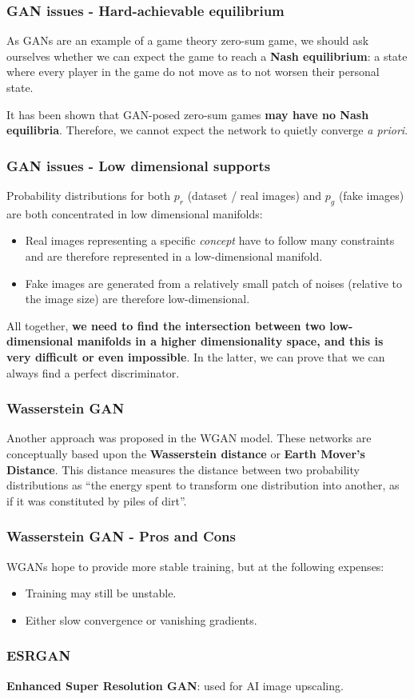 \begin{frame}
    \frametitle{GAN issues - Hard-achievable equilibrium}
    As GANs are an example of a game theory zero-sum game, we should ask ourselves whether we can expect the game to reach a \textbf{Nash equilibrium}: a state where every player in the game do not move as to not worsen their personal state.

    It has been shown that GAN-posed zero-sum games \textbf{may have no Nash equilibria}. Therefore, we cannot expect the network to quietly converge \emph{a priori}.
\end{frame}

\begin{frame}
    \frametitle{GAN issues - Low dimensional supports}
    Probability distributions for both $p_r$ (dataset / real images) and $p_g$ (fake images) are both concentrated in low dimensional manifolds:
    \begin{itemize}
        \item Real images representing a specific \emph{concept} have to follow many constraints and are therefore represented in a low-dimensional manifold.
        \item Fake images are generated from a relatively small patch of noises (relative to the image size) are therefore low-dimensional.
    \end{itemize}
    All together, \textbf{we need to find the intersection between two low-dimensional manifolds in a higher dimensionality space, and this is very difficult or even impossible}. In the latter, we can prove that we can always find a perfect discriminator.
\end{frame}

\begin{frame}
    \frametitle{Wasserstein GAN}
    Another approach was proposed in the WGAN model. These networks are conceptually based upon the \textbf{Wasserstein distance} or \textbf{Earth Mover's Distance}. This distance measures the distance between two probability distributions as ``the energy spent to transform one distribution into another, as if it was constituted by piles of dirt''.
\end{frame}

\begin{frame}
    \frametitle{Wasserstein GAN - Pros and Cons}
    WGANs hope to provide more stable training, but at the following expenses:
    \begin{itemize}
        \item Training may still be unstable.
        \item Either slow convergence or vanishing gradients.
    \end{itemize}
\end{frame}

\begin{frame}
    \frametitle{ESRGAN}
    \textbf{Enhanced Super Resolution GAN}: used for AI image upscaling.
\end{frame}